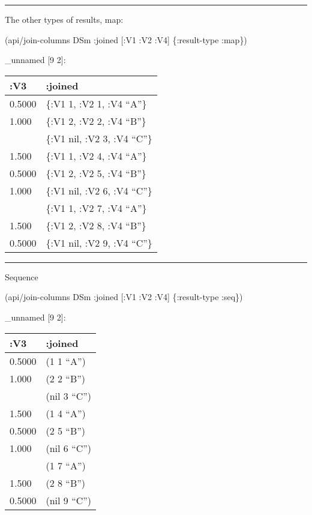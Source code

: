 \documentclass[]{article}
\newenvironment{Shaded}{\begin{snugshade}}{\end{snugshade}}
\newcommand{\AttributeTok}[1]{\textcolor[rgb]{0.77,0.63,0.00}{#1}}
\newcommand{\NormalTok}[1]{#1}
\begin{document}
\begin{center}\rule{0.5\linewidth}{0.5pt}\end{center}

The other types of results, map:

\begin{Shaded}
\begin{Highlighting}[]
\NormalTok{(api/join-columns DSm }\AttributeTok{:joined}\NormalTok{ [}\AttributeTok{:V1} \AttributeTok{:V2} \AttributeTok{:V4}\NormalTok{] \{}\AttributeTok{:result-type} \AttributeTok{:map}\NormalTok{\})}
\end{Highlighting}
\end{Shaded}

\_unnamed {[}9 2{]}:

\begin{longtable}[]{@{}ll@{}}
\toprule
:V3 & :joined\tabularnewline
\midrule
\endhead
0.5000 & \{:V1 1, :V2 1, :V4 ``A''\}\tabularnewline
1.000 & \{:V1 2, :V2 2, :V4 ``B''\}\tabularnewline
& \{:V1 nil, :V2 3, :V4 ``C''\}\tabularnewline
1.500 & \{:V1 1, :V2 4, :V4 ``A''\}\tabularnewline
0.5000 & \{:V1 2, :V2 5, :V4 ``B''\}\tabularnewline
1.000 & \{:V1 nil, :V2 6, :V4 ``C''\}\tabularnewline
& \{:V1 1, :V2 7, :V4 ``A''\}\tabularnewline
1.500 & \{:V1 2, :V2 8, :V4 ``B''\}\tabularnewline
0.5000 & \{:V1 nil, :V2 9, :V4 ``C''\}\tabularnewline
\bottomrule
\end{longtable}

\begin{center}\rule{0.5\linewidth}{0.5pt}\end{center}

Sequence

\begin{Shaded}
\begin{Highlighting}[]
\NormalTok{(api/join-columns DSm }\AttributeTok{:joined}\NormalTok{ [}\AttributeTok{:V1} \AttributeTok{:V2} \AttributeTok{:V4}\NormalTok{] \{}\AttributeTok{:result-type} \AttributeTok{:seq}\NormalTok{\})}
\end{Highlighting}
\end{Shaded}

\_unnamed {[}9 2{]}:

\begin{longtable}[]{@{}ll@{}}
\toprule
:V3 & :joined\tabularnewline
\midrule
\endhead
0.5000 & (1 1 ``A'')\tabularnewline
1.000 & (2 2 ``B'')\tabularnewline
& (nil 3 ``C'')\tabularnewline
1.500 & (1 4 ``A'')\tabularnewline
0.5000 & (2 5 ``B'')\tabularnewline
1.000 & (nil 6 ``C'')\tabularnewline
& (1 7 ``A'')\tabularnewline
1.500 & (2 8 ``B'')\tabularnewline
0.5000 & (nil 9 ``C'')\tabularnewline
\bottomrule
\end{longtable}
\end{document}
